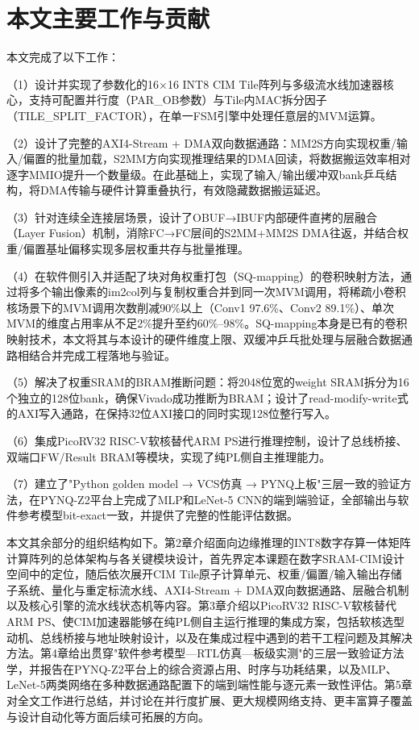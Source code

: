 \documentclass[bachelor,compact,nofont]{xjtuthesis}
\numberwithin{equation}{chapter}
\begin{document}
\section{本文主要工作与贡献}

本文完成了以下工作：

（1）设计并实现了参数化的16×16 INT8 CIM Tile阵列与多级流水线加速器核心，支持可配置并行度（PAR\_OB参数）与Tile内MAC拆分因子（TILE\_SPLIT\_FACTOR），在单一FSM引擎中处理任意层的MVM运算。

（2）设计了完整的AXI4-Stream + DMA双向数据通路：MM2S方向实现权重/输入/偏置的批量加载，S2MM方向实现推理结果的DMA回读，将数据搬运效率相对逐字MMIO提升一个数量级。在此基础上，实现了输入/输出缓冲双bank乒乓结构，将DMA传输与硬件计算重叠执行，有效隐藏数据搬运延迟。

（3）针对连续全连接层场景，设计了OBUF→IBUF内部硬件直拷的层融合（Layer Fusion）机制，消除FC→FC层间的S2MM+MM2S DMA往返，并结合权重/偏置基址偏移实现多层权重共存与批量推理。

（4）在软件侧引入并适配了块对角权重打包（SQ-mapping）的卷积映射方法，通过将多个输出像素的im2col列与复制权重合并到同一次MVM调用，将稀疏小卷积核场景下的MVM调用次数削减90\%以上（Conv1 97.6\%、Conv2 89.1\%）、单次MVM的维度占用率从不足2\%提升至约60\%--98\%。SQ-mapping本身是已有的卷积映射技术，本文将其与本设计的硬件维度上限、双缓冲乒乓批处理与层融合数据通路相结合并完成工程落地与验证。

（5）解决了权重SRAM的BRAM推断问题：将2048位宽的weight SRAM拆分为16个独立的128位bank，确保Vivado成功推断为BRAM；设计了read-modify-write式的AXI写入通路，在保持32位AXI接口的同时实现128位整行写入。

（6）集成PicoRV32 RISC-V软核替代ARM PS进行推理控制，设计了总线桥接、双端口FW/Result BRAM等模块，实现了纯PL侧自主推理能力。

（7）建立了"Python golden model → VCS仿真 → PYNQ上板"三层一致的验证方法，在PYNQ-Z2平台上完成了MLP和LeNet-5 CNN的端到端验证，全部输出与软件参考模型bit-exact一致，并提供了完整的性能评估数据。

本文其余部分的组织结构如下。第2章介绍面向边缘推理的INT8数字存算一体矩阵计算阵列的总体架构与各关键模块设计，首先界定本课题在数字SRAM-CIM设计空间中的定位，随后依次展开CIM Tile原子计算单元、权重/偏置/输入输出存储子系统、量化与重定标流水线、AXI4-Stream + DMA双向数据通路、层融合机制以及核心引擎的流水线状态机等内容。第3章介绍以PicoRV32 RISC-V软核替代ARM PS、使CIM加速器能够在纯PL侧自主运行推理的集成方案，包括软核选型动机、总线桥接与地址映射设计，以及在集成过程中遇到的若干工程问题及其解决方法。第4章给出贯穿"软件参考模型—RTL仿真—板级实测"的三层一致验证方法学，并报告在PYNQ-Z2平台上的综合资源占用、时序与功耗结果，以及MLP、LeNet-5两类网络在多种数据通路配置下的端到端性能与逐元素一致性评估。第5章对全文工作进行总结，并讨论在并行度扩展、更大规模网络支持、更丰富算子覆盖与设计自动化等方面后续可拓展的方向。
\end{document}

